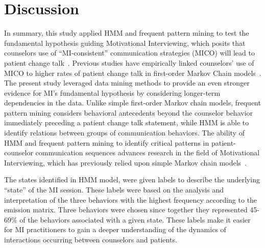 \section{Discussion}
\label{sec:discussion}
In summary, this study applied HMM and frequent pattern mining to test the fundamental hypothesis guiding Motivational Interviewing, which posits that counselors use of ``MI-consistent'' communication strategies (MICO) will lead to patient change talk~\cite{miller2009toward}. Previous studies have empirically linked counselors' use of MICO to higher rates of patient change talk in first-order Markov Chain models~\cite{moyers2006therapist, moyers2009session, gaume2010counselor}. The present study leveraged data mining methods to provide an even stronger evidence for MI's fundamental hypothesis by considering longer-term dependencies in the data. Unlike simple first-order Markov chain models, frequent pattern mining considers behavioral antecedents beyond the counselor behavior immediately preceding a patient change talk statement, while HMM is able to identify relations between groups of communication behaviors. The ability of HMM and frequent pattern mining to identify critical patterns in patient-counselor communication sequences advances research in the field of Motivational Interviewing, which has previously relied upon simple Markov chain models~\cite{moyers2006therapist, moyers2009session, gaume2008counsellor, gaume2010counselor, glynn2014change, carcone2013provider, jacques2016building}.

The states identified in HMM model, were given labels to describe the underlying ``state'' of the MI session. These labels were based on the analysis and interpretation of the three behaviors with the highest frequency according to the emission matrix. Three behaviors were chosen since together they represented 45-69\% of the behaviors associated with a given state. These labels make it easier for MI practitioners to gain a deeper understanding of the dynamics of interactions occurring between counselors and patients. 

